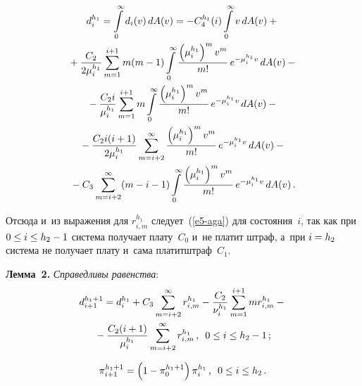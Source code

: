 \begin{multicols}{2}
  \vspace*{-3pt}
  
  \noindent 
  \begin{multline*}
  d_i^{h_1}=\int\limits_0^\infty d_i(v)\,dA(v)=-C_4^{h_1}(i)\int\limits_0^\infty 
v\,dA(v)+{}\\
  {}+\displaystyle\frac{\displaystyle C_2\mathstrut}{\displaystyle 2\mu_i^{h_1}\mathstrut} \sum\limits^{i+1}_{m=1} m(m-1) 
\int\limits_0^\infty \displaystyle\frac{\displaystyle \left(\mu_i^{h_1}\right)^m v^m\mathstrut}{\displaystyle m!\mathstrut}\,e^{-\mu_i^{h_1}v}\,dA(v)-{}\\
  {}- \displaystyle\frac{\displaystyle C_2 i\mathstrut}{\displaystyle \mu_i^{h_1}\mathstrut} \sum\limits_{m=1}^{i+1} m\int\limits_0^\infty 
\displaystyle\frac{\displaystyle \left(\mu_i^{h_1}\right)^m v^m\mathstrut}{\displaystyle m!\mathstrut}\,e^{-\mu_i^{h_1}v}\, dA(v)-{}\\
  {}-\displaystyle\frac{\displaystyle C_2 i(i+1)\mathstrut}{\displaystyle 2\mu_i^{h_1}\mathstrut}\sum\limits_{m=i+2}^\infty 
\displaystyle\frac{\displaystyle \left(\mu_i^{h_1}\right)^m v^m\mathstrut}{\displaystyle m!\mathstrut}\,e^{-\mu_i^{h_1}v}\, dA(v)-{}\\
  {}-C_3\sum\limits^\infty_{m=i+2} (m-i-1)\int\limits_0^\infty
  \displaystyle\frac{\displaystyle \left(\mu_i^{h_1}\right)^m v^m\mathstrut}{\displaystyle m!\mathstrut}\,e^{-\mu_i^{h_1}v}\,dA(v)\,.
  \end{multline*}
  
  \vspace*{-3pt}
  
  Отсюда и~из выражения для $r^{h_1}_{i,m}$ следует~(\ref{e5-aga}) для 
состояния~$i$, так как при $0\hm\leq i\hm\leq h_2\hm-1$ сис\-те\-ма получает 
плату~$C_0$ и~не платит штраф, а~при $i\hm= h_2$ сис\-те\-ма не получает плату 
и~сама платит\linebreak штраф~$C_1$. 
  
  \smallskip
  
  \noindent
  \textbf{Лемма~2.} \textit{Справедливы равенства}:
  \begin{multline}
  d_{i+1}^{h_1+1} = d_i^{h_1} +C_3\sum\limits^\infty_{m=i+2} r^{h_1}_{i,m} -
\displaystyle\frac{\displaystyle C_2\mathstrut}{\displaystyle \nu_i^{h_1}\mathstrut} \sum\limits_{m=1}^{i+1} mr^{h_1}_{i,m} -{}\\
{}-
\displaystyle\frac{\displaystyle C_2(i+1)\mathstrut}{\displaystyle \mu_i^{h_1}\mathstrut} \sum\limits^\infty_{m=i+2} r^{h_1}_{i,m}\,,\enskip 0\leq 
i\leq h_2-1\,;\label{e10-aga}
  \end{multline}

\begin{equation}
\pi^{h_1+1}_{i+1} =\left( 1-\pi_0^{h_1+1}\right) \pi_i^{h_1}\,,\enskip 0\leq i\leq 
h_2\,.
\label{e11-aga}
\end{equation}
  

\end{multicols}
